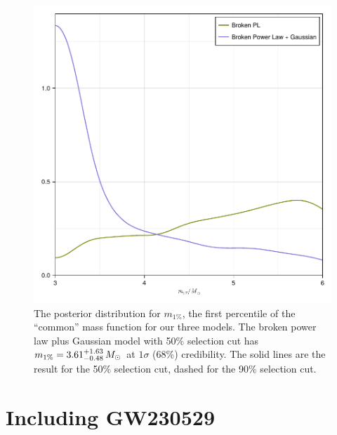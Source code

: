 \documentclass[modern]{aastex631}
\begin{document}
\begin{figure}
    \includegraphics[width=\columnwidth]{figures/m1pct.pdf}
    \caption{\label{fig:m1pct} The posterior distribution for $m_{1\%}$, the
    first percentile of the ``common'' mass function for our three models.  The
    broken power law plus Gaussian model with 50\% selection cut has $m_{1\%} =
    3.61^{+1.63}_{-0.48} \, M_\odot$ at $1\sigma$ (68\%) credibility.  The solid lines are
    the result for the 50\% selection cut, dashed for the 90\% selection cut.}
\end{figure}



\section{Including GW230529}
\end{document}
